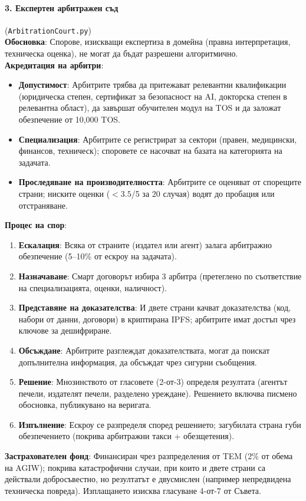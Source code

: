 \documentclass[11pt]{article}
\begin{document}
\paragraph{3. Експертен арбитражен съд} (\texttt{ArbitrationCourt.py})\\
\textbf{Обосновка}: Спорове, изискващи експертиза в домейна (правна интерпретация, техническа оценка), не могат да бъдат разрешени алгоритмично.\\
\textbf{Акредитация на арбитри}:
\begin{itemize}[noitemsep]
  \item \textbf{Допустимост}: Арбитрите трябва да притежават релевантни квалификации (юридическа степен, сертификат за безопасност на AI, докторска степен в релевантна област), да завършат обучителен модул на TOS и да заложат обезпечение от 10,000 TOS.
  \item \textbf{Специализация}: Арбитрите се регистрират за сектори (правен, медицински, финансов, техническ); споровете се насочват на базата на категорията на задачата.
  \item \textbf{Проследяване на производителността}: Арбитрите се оценяват от спорещите страни; ниските оценки ($<3.5$/5 за 20 случая) водят до пробация или отстраняване.
\end{itemize}
\textbf{Процес на спор}:
\begin{enumerate}[noitemsep]
  \item \textbf{Ескалация}: Всяка от страните (издател или агент) залага арбитражно обезпечение (5--10\% от ескроу на задачата).
  \item \textbf{Назначаване}: Смарт договорът избира 3 арбитра (претеглено по съответствие на специализацията, оценки, наличност).
  \item \textbf{Представяне на доказателства}: И двете страни качват доказателства (код, набори от данни, договори) в криптирана IPFS; арбитрите имат достъп чрез ключове за дешифриране.
  \item \textbf{Обсъждане}: Арбитрите разглеждат доказателствата, могат да поискат допълнителна информация, да обсъждат чрез сигурни съобщения.
  \item \textbf{Решение}: Мнозинството от гласовете (2-от-3) определя резултата (агентът печели, издателят печели, разделено уреждане). Решението включва писмено обосновка, публикувано на веригата.
  \item \textbf{Изпълнение}: Ескроу се разпределя според решението; загубилата страна губи обезпечението (покрива арбитражни такси + обезщетения).
\end{enumerate}
\textbf{Застрахователен фонд}: Финансиран чрез разпределения от TEM (2\% от обема на AGIW); покрива катастрофични случаи, при които и двете страни са действали добросъвестно, но резултатът е двусмислен (например непредвидена техническа повреда). Изплащането изисква гласуване 4-от-7 от Съвета.
\end{document}
